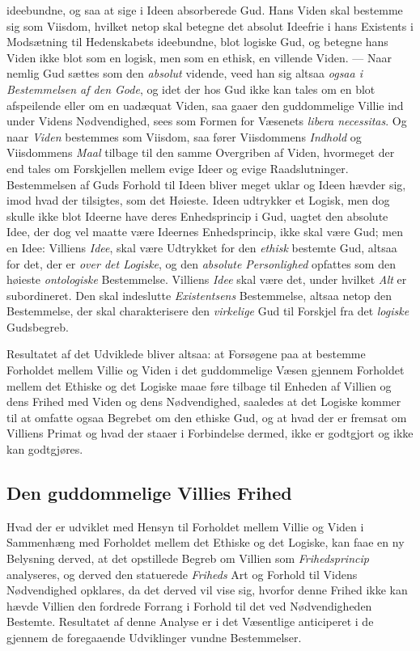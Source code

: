 \documentclass[12pt,a4paper]{book}
\newcommand{\opage}[1]{\marginnote{\footnotesize\textit{[#1]}}}
\begin{document}
ideebundne, og saa at sige i Ideen absorberede Gud. Hans Viden skal bestemme sig
som Viisdom, hvilket netop skal betegne det absolut Ideefrie i hans Existents i
Modsætning til Hedenskabets ideebundne, blot logiske Gud, og betegne hans Viden
ikke blot som en logisk, men som en ethisk, en villende Viden. --- Naar nemlig Gud
sættes som den \emph{absolut} vidende, veed han sig altsaa \emph{ogsaa i Bestemmelsen af den Gode}, og idet der hos Gud ikke kan tales om en blot afspeilende eller om en
uadæquat Viden, saa gaaer den guddommelige Villie ind under Videns Nødvendighed,
sees som Formen for Væsenets \textit{libera necessitas}. Og naar \emph{Viden} bestemmes
som Viisdom, saa fører Viisdommens \emph{Indhold} og Viisdommens \emph{Maal}
tilbage til den samme Overgriben af Viden, hvormeget der end tales om Forskjellen
mellem evige Ideer og evige Raadslutninger. Bestemmelsen af Guds Forhold til Ideen
bliver meget uklar og Ideen hævder sig, imod hvad der tilsigtes, som det Høieste.
Ideen udtrykker et Logisk, men dog skulle ikke blot Ideerne have deres
Enhedsprincip i Gud, uagtet den absolute Idee, der dog vel maatte være Ideernes
Enhedsprincip, ikke skal være Gud; men en Idee: Villiens \emph{Idee}, skal være Udtrykket
for den \emph{ethisk} bestemte Gud, altsaa for det, der er \emph{over det Logiske}, og den
\emph{absolute Personlighed} opfattes som den høieste \emph{ontologiske} Bestemmelse.
Villiens \emph{Idee} skal være det, under hvilket \emph{Alt} er subordineret. Den skal indeslutte
\emph{Existentsens} Bestemmelse, altsaa netop den Bestemmelse, der \opage{64}skal charakterisere den \emph{virkelige} Gud til Forskjel fra det \emph{logiske} Gudsbegreb.

Resultatet af det Udviklede bliver altsaa: at Forsøgene paa at bestemme Forholdet
mellem Villie og Viden i det guddommelige Væsen gjennem Forholdet mellem det
Ethiske og det Logiske maae føre tilbage til Enheden af Villien og dens Frihed med
Viden og dens Nødvendighed, saaledes at det Logiske kommer til at omfatte ogsaa
Begrebet om den ethiske Gud, og at hvad der er fremsat om Villiens Primat og hvad
der staaer i Forbindelse dermed, ikke er godtgjort og ikke kan godtgjøres.

\subsection{Den guddommelige Villies Frihed}
\label{ssec:guds-frihed}

Hvad der er udviklet med Hensyn til Forholdet mellem Villie og Viden i Sammenhæng
med Forholdet mellem det Ethiske og det Logiske, kan faae en ny Belysning derved,
at det opstillede Begreb om Villien som \emph{Frihedsprincip} analyseres, og derved den
statuerede \emph{Friheds} Art og Forhold til Videns Nødvendighed opklares, da det derved
vil vise sig, hvorfor denne Frihed ikke kan hævde Villien den fordrede Forrang i
Forhold til det ved Nødvendigheden Bestemte. Resultatet af denne Analyse er i det
Væsentlige anticiperet i de gjennem de foregaaende Udviklinger vundne Bestemmelser.
\end{document}
